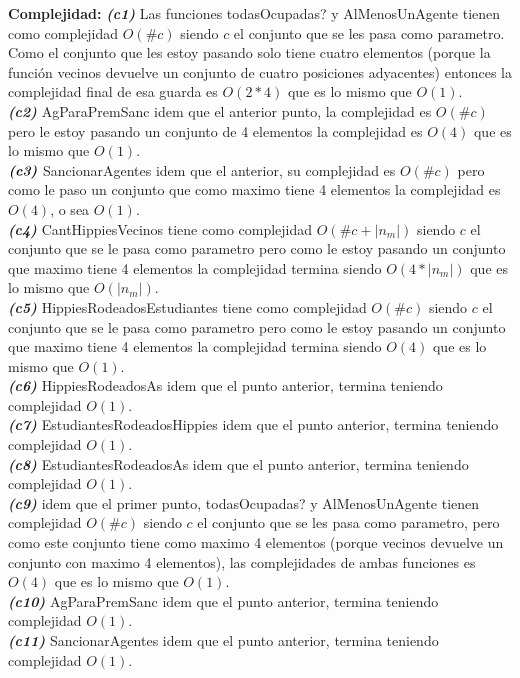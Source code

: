 \textbf{Complejidad:} \textit{\textbf{(c1)}} Las funciones todasOcupadas? y AlMenosUnAgente tienen como complejidad $O(\#c)$ siendo $c$ el conjunto que se les pasa como parametro. Como el conjunto que les estoy pasando solo tiene cuatro elementos (porque la función vecinos devuelve un conjunto de cuatro posiciones adyacentes) entonces la complejidad final de esa guarda es $O(2*4)$ que es lo mismo que $O(1)$. \\
\textit{\textbf{(c2)}} AgParaPremSanc idem que el anterior punto, la complejidad es $O(\#c)$ pero le estoy pasando un conjunto de 4 elementos la complejidad es $O(4)$ que es lo mismo que $O(1)$. \\
$\textit{\textbf{(c3)}}$ SancionarAgentes idem que el anterior, su complejidad es $O(\#c)$ pero como le paso un conjunto que como maximo tiene 4 elementos la complejidad es $O(4)$, o sea $O(1)$. \\
\textit{\textbf{(c4)}} CantHippiesVecinos tiene como complejidad $O(\#c + |n_m|)$ siendo $c$ el conjunto que se le pasa como parametro pero como le estoy pasando un conjunto que maximo tiene 4 elementos la complejidad termina siendo $O(4*|n_m|)$ que es lo mismo que $O(|n_m|)$. \\
\textit{\textbf{(c5)}} HippiesRodeadosEstudiantes tiene como complejidad $O(\#c)$ siendo $c$ el conjunto que se le pasa como parametro pero como le estoy pasando un conjunto que maximo tiene 4 elementos la complejidad termina siendo $O(4)$ que es lo mismo que $O(1)$. \\
\textit{\textbf{(c6)}} HippiesRodeadosAs idem que el punto anterior, termina teniendo complejidad $O(1)$. \\
\textit{\textbf{(c7)}} EstudiantesRodeadosHippies idem que el punto anterior, termina teniendo complejidad $O(1)$. \\
\textit{\textbf{(c8)}} EstudiantesRodeadosAs idem que el punto anterior, termina teniendo complejidad $O(1)$. \\
\textit{\textbf{(c9)}} idem que el primer punto, todasOcupadas? y AlMenosUnAgente tienen complejidad $O(\#c)$ siendo $c$ el conjunto que se les pasa como parametro, pero como este conjunto tiene como maximo 4 elementos (porque vecinos devuelve un conjunto con maximo 4 elementos), las complejidades de ambas funciones es $O(4)$ que es lo mismo que $O(1)$. \\
\textit{\textbf{(c10)}} AgParaPremSanc idem que el punto anterior, termina teniendo complejidad $O(1)$. \\
\textit{\textbf{(c11)}} SancionarAgentes idem que el punto anterior, termina teniendo complejidad $O(1)$. \\
